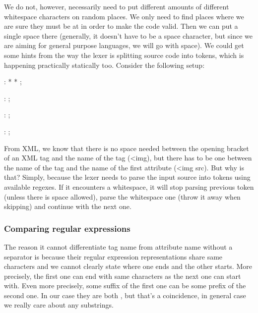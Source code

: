 We do not, however, necessarily need to put different amounts of different whitespace characters on random places. We only need to find places where we are sure they must be at in order to make the code valid. Then we can put a single space there (generally, it doesn't have to be a space character, but since we are aiming for general purpose languages, we will go with space). We could get some hints from the way the lexer is splitting source code into tokens, which is happening practically statically too. Consider the following setup:

\begin{antlr}
	    :   \literal{<}  * \literal{>} * \literal{</}  \literal{>} ;
	
	  :       ;
	
	       :    ;

	       :   \regex{~[<"]*} ;
\end{antlr}

From XML, we know that there is no space needed between the opening bracket of an XML tag and the name of the tag (<img), but there has to be one between the name of the tag and the name of the first attribute (<img src). But why is that? Simply, because the lexer needs to parse the input source into tokens using available regexes. If it encounters a whitespace, it will stop parsing previous token (unless there is space allowed), parse the whitespace one (throw it away when skipping) and continue with the next one. 

\subsubsection{Comparing regular expressions}

The reason it cannot differentiate tag name from attribute name without a separator is because their regular expression representations share same characters and we cannot clearly state where one ends and the other starts. More precisely, the first one can end with same characters as the next one can start with. Even more precisely, some suffix of the first one can be some prefix of the second one. In our case they are both , but that's a coincidence, in general case we really care about any substrings.
\\


